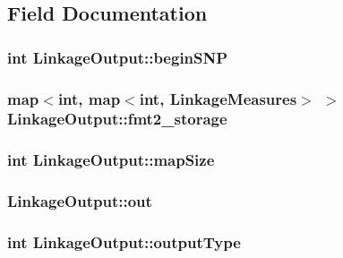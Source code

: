 \subsection{Field Documentation}
\hypertarget{classLinkageOutput_a414495118232cbda3297645f8eabd538}{
\subsubsection[{beginSNP}]{\setlength{\rightskip}{0pt plus 5cm}int {\bf LinkageOutput::beginSNP}}}
\label{classLinkageOutput_a414495118232cbda3297645f8eabd538}
\hypertarget{classLinkageOutput_aa9c87193fee4917ca92ac64e72bedf61}{
\subsubsection[{fmt2\_\-storage}]{\setlength{\rightskip}{0pt plus 5cm}map$<$int, map$<$int, {\bf LinkageMeasures}$>$ $>$ {\bf LinkageOutput::fmt2\_\-storage}}}
\label{classLinkageOutput_aa9c87193fee4917ca92ac64e72bedf61}
\hypertarget{classLinkageOutput_aac75f7a820c77bb69abc5ee925d6e56d}{
\subsubsection[{mapSize}]{\setlength{\rightskip}{0pt plus 5cm}int {\bf LinkageOutput::mapSize}}}
\label{classLinkageOutput_aac75f7a820c77bb69abc5ee925d6e56d}
\hypertarget{classLinkageOutput_a5ec16dbe108da0445df84a95839637d6}{
\subsubsection[{out}]{ {\bf LinkageOutput::out}}}
\label{classLinkageOutput_a5ec16dbe108da0445df84a95839637d6}
\hypertarget{classLinkageOutput_a8f1a7689bf42f566a0efcd602023937d}{
\subsubsection[{outputType}]{\setlength{\rightskip}{0pt plus 5cm}int {\bf LinkageOutput::outputType}}}
\label{classLinkageOutput_a8f1a7689bf42f566a0efcd602023937d}


